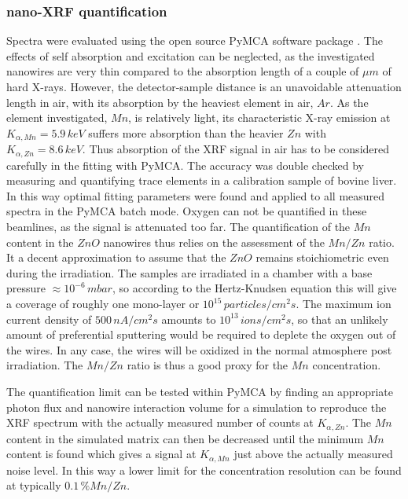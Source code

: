 \subsubsection{nano-XRF quantification}

Spectra were evaluated using the open source PyMCA software package \cite{sole_multiplatform_2007}. The effects of self absorption and excitation can be neglected, as the investigated nanowires are very thin compared to the absorption length of a couple of $\mu m$ of hard X-rays. However, the detector-sample distance is an unavoidable attenuation length in air, with its absorption by the heaviest element in air, $Ar$. As the element investigated, $Mn$, is relatively light, its characteristic X-ray emission at $K_{\alpha,Mn} = 5.9\,keV$ suffers more absorption than the heavier $Zn$ with $K_{\alpha,Zn} = 8.6\,keV$. Thus absorption of the XRF signal in air has to be considered carefully in the fitting with PyMCA. The accuracy was double checked by measuring and quantifying trace elements in a calibration sample of bovine liver. In this way optimal fitting parameters were found and applied to all measured spectra in the PyMCA batch mode. Oxygen can not be quantified in these beamlines, as the signal is attenuated too far. The quantification of the $Mn$ content in the $ZnO$ nanowires thus relies on the assessment of the $Mn/Zn$ ratio. It a decent approximation to assume that the $ZnO$ remains stoichiometric even during the irradiation. The samples are irradiated in a chamber with a base pressure $\approx 10^{-6}\,mbar$, so according to the Hertz-Knudsen equation this will give a coverage of roughly one mono-layer or $10^{15}\,particles/cm^2s$. The maximum ion current density of $500\,nA/cm^2s$ amounts to $10^{13}\,ions/cm^2s$, so that an unlikely amount of preferential sputtering would be required to deplete the oxygen out of the wires. In any case, the wires will be oxidized in the normal atmosphere post irradiation. The $Mn/Zn$ ratio is thus a good proxy for the $Mn$ concentration.

The quantification limit can be tested within PyMCA by finding an appropriate photon flux and nanowire interaction volume for a simulation to reproduce the XRF spectrum with the actually measured number of counts at $K_{\alpha,Zn}$. The $Mn$ content in the simulated matrix can then be decreased until the minimum $Mn$ content is found which gives a signal at $K_{\alpha,Mn}$ just above the actually measured noise level. In this way a lower limit for the concentration resolution can be found at typically $0.1\,\% Mn/Zn$.



